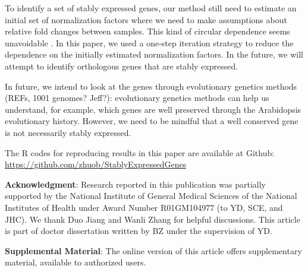 \documentclass[letterpaper,12pt]{article}
\begin{document}

To identify a set of stably expressed genes, our method still need to estimate
an initial set of normalization factors where we need to make assumptions
about relative fold changes between samples. This kind of circular dependence
seems unavoidable \citep{vandesompele2002accurate}. In this paper, we used a one-step iteration strategy to reduce the dependence on the initially estimated
normalization factors.  In the future, we will attempt to identify orthologous genes that are stably expressed. 

In future, we intend to look at the genes through
evolutionary genetics methods (REFs, 1001 genomes? Jeff?): evolutionary genetics methods can help us understand, 
for example, which genes are well preserved through the
Arabidopsis evolutionary history. However, we need to be mindful that a well
conserved gene is not necessarily stably expressed. 



The R codes for reproducing results in this paper are available at Github:
\url{https://github.com/zhuob/StablyExpressedGenes}



\textbf{Acknowledgment}: Research reported in this publication was partially supported by the National Institute of General Medical Sciences of the National Institutes of Health under Award Number R01GM104977 (to YD, SCE, and JHC). We thank Duo Jiang and Wanli Zhang for helpful discussions. This article is part of doctor dissertation written by BZ under the supervision of YD. 

\textbf{Supplemental Material}: The online version of this article offers supplementary material,
available to authorized users.
\end{document}

